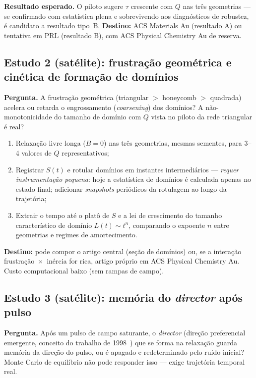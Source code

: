 \documentclass[11pt,a4paper]{article}
\begin{document}
\textbf{Resultado esperado.} O piloto sugere $\tau$ crescente com $Q$
nas três geometrias --- se confirmado com estatística plena e sobrevivendo
aos diagnósticos de robustez, é candidato a resultado tipo~B.
\textbf{Destino:} ACS Materials Au (resultado A) ou tentativa em PRL
(resultado B), com ACS Physical Chemistry Au de reserva.

\subsection{Estudo 2 (satélite): frustração geométrica e cinética de
formação de domínios}

\textbf{Pergunta.} A frustração geométrica (triangular $>$ honeycomb $>$
quadrada) acelera ou retarda o engrossamento (\emph{coarsening}) dos
domínios? A não-monotonicidade do tamanho de domínio com $Q$ vista no
piloto da rede triangular é real?

\begin{enumerate}
\item Relaxação livre longa ($B = 0$) nas três geometrias, mesmas
sementes, para 3--4 valores de $Q$ representativos;
\item Registrar $S(t)$ e rotular domínios em instantes intermediários
--- \emph{requer instrumentação pequena}: hoje a estatística de domínios
é calculada apenas no estado final; adicionar \emph{snapshots} periódicos
da rotulagem ao longo da trajetória;
\item Extrair o tempo até o platô de $S$ e a lei de crescimento do
tamanho característico de domínio $L(t) \sim t^{n}$, comparando o
expoente $n$ entre geometrias e regimes de amortecimento.
\end{enumerate}

\textbf{Destino:} pode compor o artigo central (seção de domínios) ou,
se a interação frustração~$\times$~inércia for rica, artigo próprio em
ACS Physical Chemistry Au. Custo computacional baixo (sem rampas de
campo).

\subsection{Estudo 3 (satélite): memória do \emph{director} após pulso}

\textbf{Pergunta.} Após um pulso de campo saturante, o \emph{director}
(direção preferencial emergente, conceito do trabalho de
1998~\cite{prb1998}) que se forma na relaxação guarda memória da direção
do pulso, ou é apagado e redeterminado pelo ruído inicial? Monte Carlo
de equilíbrio não pode responder isso --- exige trajetória temporal
real.
\end{document}
